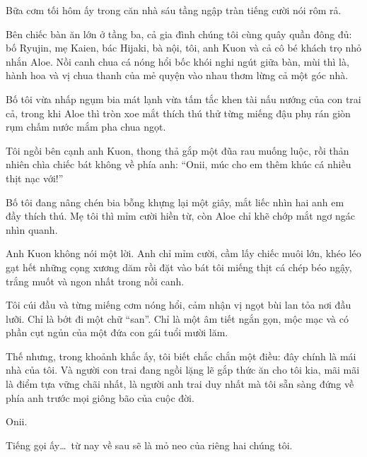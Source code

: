 \documentclass[../main.tex]{subfiles}
\begin{document}
\ct

Bữa cơm tối hôm ấy trong căn nhà sáu tầng ngập tràn tiếng cười nói rôm rả.

Bên chiếc bàn ăn lớn ở tầng ba, cả gia đình chúng tôi cùng quây quần đông đủ: bố Ryujin, mẹ Kaien, bác Hijaki, bà nội, tôi, anh Kuon và cả cô bé khách trọ nhỏ nhắn Aloe. Nồi canh chua cá nóng hổi bốc khói nghi ngút giữa bàn, mùi thì là, hành hoa và vị chua thanh của mẻ quyện vào nhau thơm lừng cả một góc nhà.

Bố tôi vừa nhấp ngụm bia mát lạnh vừa tấm tắc khen tài nấu nướng của con trai cả, trong khi Aloe thì tròn xoe mắt thích thú thử từng miếng đậu phụ rán giòn rụm chấm nước mắm pha chua ngọt.

Tôi ngồi bên cạnh anh Kuon, thong thả gắp một đũa rau muống luộc, rồi thản nhiên chìa chiếc bát không về phía anh: ``Onii, múc cho em thêm khúc cá nhiều thịt nạc với!''

Bố tôi đang nâng chén bia bỗng khựng lại một giây, mắt liếc nhìn hai anh em đầy thích thú. Mẹ tôi thì mỉm cười hiền từ, còn Aloe chỉ khẽ chớp mắt ngơ ngác nhìn quanh.

Anh Kuon không nói một lời. Anh chỉ mỉm cười, cầm lấy chiếc muôi lớn, khéo léo gạt hết những cọng xương dăm rồi đặt vào bát tôi miếng thịt cá chép béo ngậy, trắng muốt và ngon nhất trong nồi canh.

Tôi cúi đầu và từng miếng cơm nóng hổi, cảm nhận vị ngọt bùi lan tỏa nơi đầu lưỡi. Chỉ là bớt đi một chữ ``san''. Chỉ là một âm tiết ngắn gọn, mộc mạc và có phần cụt ngủn của một đứa con gái tuổi mười lăm.

Thế nhưng, trong khoảnh khắc ấy, tôi biết chắc chắn một điều: đây chính là mái nhà của tôi. Và người con trai đang ngồi lặng lẽ gắp thức ăn cho tôi kia, mãi mãi là điểm tựa vững chãi nhất, là người anh trai duy nhất mà tôi sẵn sàng đứng về phía anh trước mọi giông bão của cuộc đời.

Onii.

Tiếng gọi ấy\dots\ từ nay về sau sẽ là mỏ neo của riêng hai chúng tôi.
\end{document}

